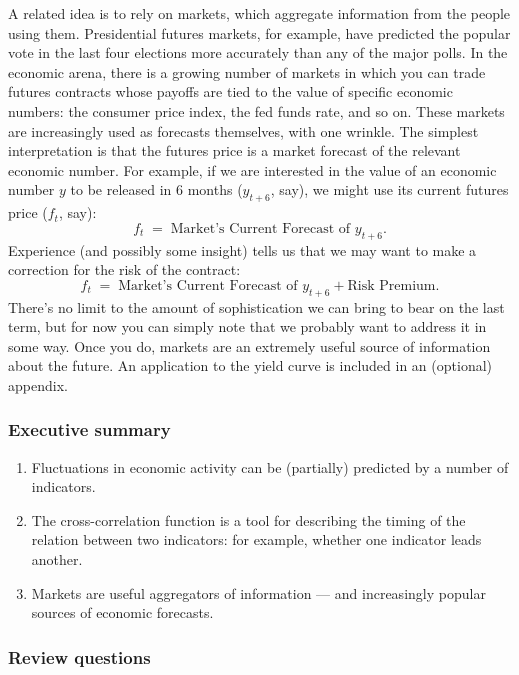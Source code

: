 \documentclass[letterpaper,12pt]{article}
\begin{document}
A related idea is to rely on markets, which aggregate information
from the people using them.  Presidential futures markets, for
example, have predicted the popular vote in the last four
elections more accurately than any of the major polls.
In the economic arena, there is a growing number of markets
in which you can trade futures contracts whose payoffs are tied
to the value of specific economic numbers:
the consumer price index, the fed funds rate, and so on.
These markets are increasingly used as forecasts themselves, with one wrinkle.
The simplest interpretation is that the futures price is a market forecast
of the relevant economic number.
For example, if we are interested in the value of an economic number $y$
to be released in 6 months ($y_{t+6}$, say),
we might use its current futures price ($f_t$, say):
\[
    f_t  \;=\;  \mbox{Market's Current Forecast of } y_{t+6} .
\]
Experience (and possibly some insight) tells us that we may want to make a
correction for the risk of the contract:
\[
    f_t  \;=\;  \mbox{Market's Current Forecast of } y_{t+6}
                + \mbox{Risk Premium} .
\]
There's no limit to the amount of sophistication
we can bring to bear on the last term,
but for now you can simply note that
we probably want to address it in some way.
Once you do, markets are an extremely useful source of information
about the future.
An application to the yield curve is included in an (optional)
appendix.


\subsubsection*{Executive summary}

\begin{enumerate}
\item Fluctuations in economic activity can be (partially)
predicted by a number of indicators.

\item The cross-correlation function is a tool for describing the
timing of the relation between two indicators:
for example, whether one indicator leads another.

\item Markets are useful aggregators of information ---
and increasingly popular sources of economic forecasts.
\end{enumerate}


\subsubsection*{Review questions}
\end{document}
